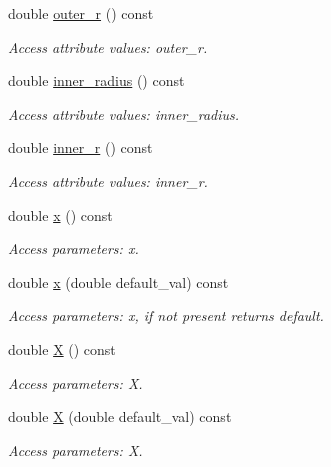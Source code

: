\begin{DoxyCompactItemize}
double \hyperlink{struct_d_d4hep_1_1_x_m_l_1_1_dimension_a7461ae48cd5a2b3038e5c418a280fe32}{outer\+\_\+r} () const
\begin{DoxyCompactList}\small\item\em Access attribute values\+: outer\+\_\+r. \end{DoxyCompactList}\item 
double \hyperlink{struct_d_d4hep_1_1_x_m_l_1_1_dimension_aed7c23e43e99fc9fe6fa0e5c6338c86c}{inner\+\_\+radius} () const
\begin{DoxyCompactList}\small\item\em Access attribute values\+: inner\+\_\+radius. \end{DoxyCompactList}\item 
double \hyperlink{struct_d_d4hep_1_1_x_m_l_1_1_dimension_a37548157359371f57e2d6182c65ec31c}{inner\+\_\+r} () const
\begin{DoxyCompactList}\small\item\em Access attribute values\+: inner\+\_\+r. \end{DoxyCompactList}\item 
double \hyperlink{struct_d_d4hep_1_1_x_m_l_1_1_dimension_ac99400d153381882b85481a83541d82a}{x} () const
\begin{DoxyCompactList}\small\item\em Access parameters\+: x. \end{DoxyCompactList}\item 
double \hyperlink{struct_d_d4hep_1_1_x_m_l_1_1_dimension_a767cd7d05e0c329f23cd1023dce16dd2}{x} (double default\+\_\+val) const
\begin{DoxyCompactList}\small\item\em Access parameters\+: x, if not present returns default. \end{DoxyCompactList}\item 
double \hyperlink{struct_d_d4hep_1_1_x_m_l_1_1_dimension_a82731be8e9c0288c26159b1fde83a0af}{X} () const
\begin{DoxyCompactList}\small\item\em Access parameters\+: X. \end{DoxyCompactList}\item 
double \hyperlink{struct_d_d4hep_1_1_x_m_l_1_1_dimension_af78bec5e9228f7e89226ce43ec8d1a45}{X} (double default\+\_\+val) const
\begin{DoxyCompactList}\small\item\em Access parameters\+: X. \end{DoxyCompactList}\item 

\end{DoxyCompactItemize}
